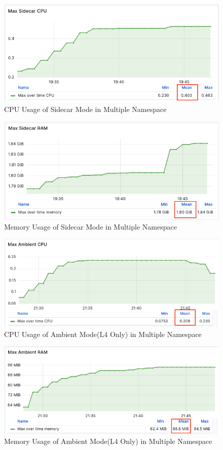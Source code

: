 \begin{figure}[H]
  \centering
  \includegraphics[width=0.8\linewidth]{resources/multi-ns-sidecar-cpu.png}
  \caption{CPU Usage of Sidecar Mode in Multiple Namespace}
\end{figure}

\begin{figure}[H]
  \centering
  \includegraphics[width=0.8\linewidth]{resources/multi-ns-sidecar-mem.png}
  \caption{Memory Usage of Sidecar Mode in Multiple Namespace}
\end{figure}

\begin{figure}[H]
  \centering
  \includegraphics[width=0.8\linewidth]{resources/ambient-multi-ns-l4-cpu.png}
  \caption{CPU Usage of Ambient Mode(L4 Only) in Multiple Namespace}
\end{figure}

\begin{figure}[H]
  \centering
  \includegraphics[width=0.85\linewidth]{resources/ambient-multi-ns-l4-mem.png}
  \caption{Memory Usage of Ambient Mode(L4 Only) in Multiple Namespace}
\end{figure}


